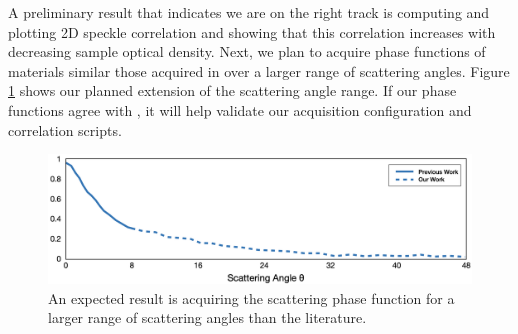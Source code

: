 A preliminary result that indicates we are on the right track is computing and plotting 2D speckle correlation and showing that this correlation increases with decreasing sample optical density. Next, we plan to acquire phase functions of materials similar those acquired in \cite{alterman2022direct} over a larger range of scattering angles. Figure \ref{fig:extended_phase_function} shows our planned extension of the scattering angle range. If our phase functions agree with \cite{alterman2022direct}, it will help validate our acquisition configuration and correlation scripts.
%
\begin{figure}
    \centering
    \includegraphics[width=\textwidth]{figures/extended_phase_function.png}
    \caption{An expected result is acquiring the scattering phase function for a larger range of scattering angles than the literature.}
    \label{fig:extended_phase_function}
\end{figure}